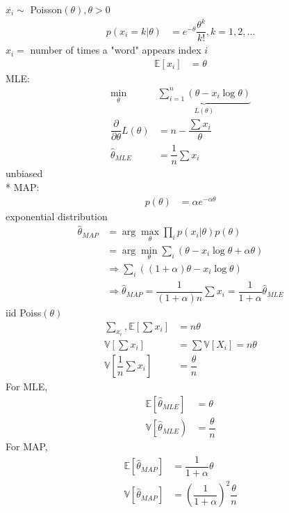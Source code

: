 \documentclass{article}
\begin{document}
\begin{eg} \label{eg:pois} 
$x_{i} \sim $ Poisson$\left(\theta\right), \theta > 0$
\begin{align*}
p\left(x_{i} = k | \theta\right)  &= e^{-\theta} \dfrac{\theta^{k}}{k!}, k = 1, 2, ...
\end{align*}
$x_{i} =$ number of times a "word" appears index $i $
\begin{align*}
\mathbb{E}\left[x_{i}\right] &= \theta
\end{align*}
MLE:
\begin{align*}
\displaystyle\min_{\theta} &  \underbrace{\displaystyle\sum_{i=1}^{n} \left(\theta - x_{i} \log \theta\right)}_{L\left(\theta\right)}
\\ \dfrac{\partial }{\partial \theta} L\left(\theta\right) &= n - \dfrac{\displaystyle\sum x_{i}}{\theta}
\\ \hat{\theta}_{MLE} &= \dfrac{1}{n} \displaystyle\sum x_{i}
\end{align*}
unbiased
\\* MAP:
\begin{align*}
p\left(\theta\right)  &= \alpha e^{-\alpha \theta}
\end{align*}
exponential distribution
\begin{align*}
\hat{\theta}_{MAP} &= \arg\displaystyle\max_{\theta} \displaystyle\prod_{i} p\left(x_{i} | \theta\right) p\left(\theta\right)
\\ &= \arg\displaystyle\min_{\theta} \displaystyle\sum_{i} \left(\theta - x_{i} \log \theta + \alpha \theta\right)
\\ &\Rightarrow  \displaystyle\sum_{i} \left(\left(1 + \alpha\right) \theta - x_{i} \log \theta\right)
\\ &\Rightarrow  \hat{\theta}_{MAP} = \dfrac{1}{\left(1 + \alpha\right) n} \displaystyle\sum x_{i} = \dfrac{1}{1 + \alpha} \hat{\theta}_{MLE}
\end{align*}
iid Poiss$\left(\theta\right)$
\begin{align*}
\displaystyle\sum_{x_{i}}, \mathbb{E}\left[\displaystyle\sum x_{i}\right] &= n \theta
\\ \mathbb{V}\left[\displaystyle\sum x_{i}\right] &= \displaystyle\sum \mathbb{V}\left[X_{i}\right] = n \theta
\\ \mathbb{V}\left[\dfrac{1}{n} \displaystyle\sum x_{i}\right] &= \dfrac{\theta}{n}
\end{align*}
For MLE,
\begin{align*}
\mathbb{E}\left[\hat{\theta}_{MLE}\right] &= \theta
\\ \mathbb{V}\left[\hat{\theta}_{MLE}\right) &= \dfrac{\theta}{n}
\end{align*}
For MAP,
\begin{align*}
\mathbb{E}\left[\hat{\theta}_{MAP}\right] &= \dfrac{1}{1 + \alpha} \theta
\\ \mathbb{V}\left[\hat{\theta}_{MAP}\right] &= \left(\dfrac{1}{1 + \alpha}\right)^{2} \dfrac{\theta}{n}
\end{align*}\end{eg}
\end{document}
